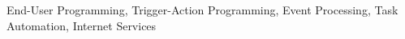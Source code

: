 
\begin{IEEEkeywords}
End-User Programming, Trigger-Action Programming, Event Processing, Task Automation, Internet Services
\end{IEEEkeywords}

